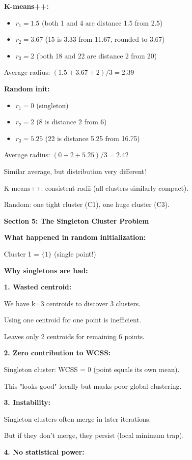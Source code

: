 \documentclass[12pt]{article}
\begin{document}
\begin{explanation}
\textbf{K-means++:}
\begin{itemize}
    \item $r_1 = 1.5$ (both 1 and 4 are distance 1.5 from 2.5)
    \item $r_2 = 3.67$ (15 is 3.33 from 11.67, rounded to 3.67)
    \item $r_3 = 2$ (both 18 and 22 are distance 2 from 20)
\end{itemize}

Average radius: $(1.5 + 3.67 + 2)/3 = 2.39$

\textbf{Random init:}
\begin{itemize}
    \item $r_1 = 0$ (singleton)
    \item $r_2 = 2$ (8 is distance 2 from 6)
    \item $r_3 = 5.25$ (22 is distance 5.25 from 16.75)
\end{itemize}

Average radius: $(0 + 2 + 5.25)/3 = 2.42$

Similar average, but distribution very different!

K-means++: consistent radii (all clusters similarly compact).

Random: one tight cluster (C1), one huge cluster (C3).

\textbf{Section 5: The Singleton Cluster Problem}

\textbf{What happened in random initialization:}

Cluster 1 = $\{1\}$ (single point!)

\textbf{Why singletons are bad:}

\textbf{1. Wasted centroid:}

We have k=3 centroids to discover 3 clusters.

Using one centroid for one point is inefficient.

Leaves only 2 centroids for remaining 6 points.

\textbf{2. Zero contribution to WCSS:}

Singleton cluster: WCSS = 0 (point equals its own mean).

This "looks good" locally but masks poor global clustering.

\textbf{3. Instability:}

Singleton clusters often merge in later iterations.

But if they don't merge, they persist (local minimum trap).

\textbf{4. No statistical power:}


\end{explanation}
\end{document}
